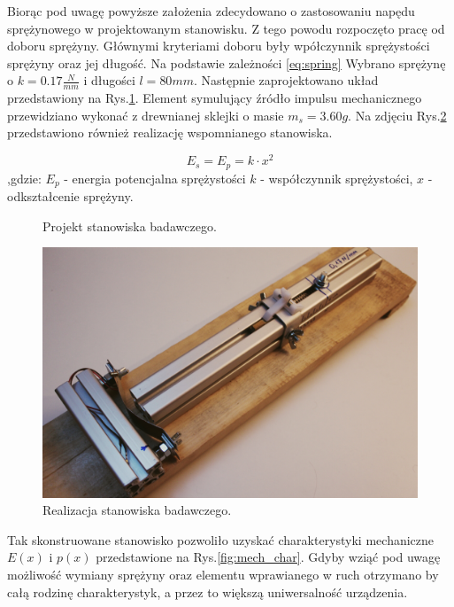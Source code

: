\indent %
Biorąc pod uwagę powyższe założenia zdecydowano o zastosowaniu napędu sprężynowego w projektowanym stanowisku. Z tego powodu rozpoczęto pracę od doboru sprężyny. Głównymi kryteriami doboru były wpółczynnik sprężystości sprężyny oraz jej długość. Na podstawie zależności \ref{eq:spring} Wybrano sprężynę o $k=0.17\frac{N}{mm}$ i długości $l=80mm$. Następnie zaprojektowano
układ przedstawiony na Rys.\ref{fig:test_stand}. Element symulujący źródło impulsu mechanicznego przewidziano wykonać z drewnianej sklejki o masie $m_s = 3.60g$. Na zdjęciu Rys.\ref{fig:test_stand_photo} przedstawiono również realizację wspomnianego stanowiska.

\begin{equation}
E_s = E_p = k \cdot x^2
\label{eq:spring}
\end{equation}
,gdzie: $E_p$ - energia potencjalna sprężystości $k$ - współczynnik sprężystości, $x$ - odkształcenie sprężyny.


\begin{figure}[htbp]
\centering
{}%
\caption{Projekt stanowiska badawczego.}
\label{fig:test_stand}
\end{figure}

\begin{figure}[htbp]
\centering
\includegraphics[width=\linewidth]{pictures/lab_stand.jpg}
\caption{Realizacja stanowiska badawczego.}
\label{fig:test_stand_photo}
\end{figure}

Tak skonstruowane stanowisko pozwoliło uzyskać charakterystyki mechaniczne $E(x)$ i $p(x)$ przedstawione na Rys.\ref{fig:mech_char}. Gdyby wziąć pod uwagę możliwość wymiany sprężyny oraz elementu wprawianego w ruch otrzymano by całą rodzinę charakterystyk, a przez to większą uniwersalność urządzenia.

